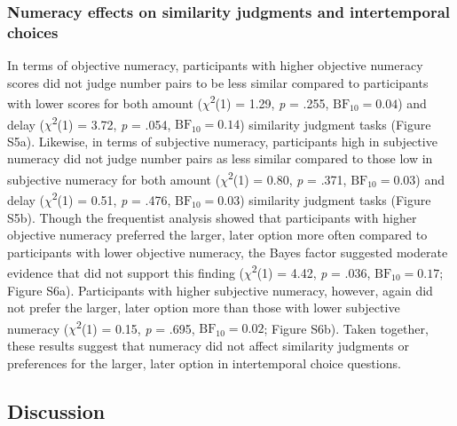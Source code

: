 \documentclass[
  pub,floatsintext]{apa6}
\begin{document}
\hypertarget{numeracy-effects-on-similarity-judgments-and-intertemporal-choices-1}{%
\subsubsection{Numeracy effects on similarity judgments and intertemporal choices}\label{numeracy-effects-on-similarity-judgments-and-intertemporal-choices-1}}

In terms of objective numeracy, participants with higher objective numeracy scores did not judge number pairs to be less similar compared to participants with lower scores for both amount (\(\chi\)\textsuperscript{2}(1) = 1.29, \emph{p} = .255, \(\mathrm{BF}_{\textrm{10}} = 0.04\)) and delay (\(\chi\)\textsuperscript{2}(1) = 3.72, \emph{p} = .054, \(\mathrm{BF}_{\textrm{10}} = 0.14\)) similarity judgment tasks (Figure S5a). Likewise, in terms of subjective numeracy, participants high in subjective numeracy did not judge number pairs as less similar compared to those low in subjective numeracy for both amount (\(\chi\)\textsuperscript{2}(1) = 0.80, \emph{p} = .371, \(\mathrm{BF}_{\textrm{10}} = 0.03\)) and delay (\(\chi\)\textsuperscript{2}(1) = 0.51, \emph{p} = .476, \(\mathrm{BF}_{\textrm{10}} = 0.03\)) similarity judgment tasks (Figure S5b). Though the frequentist analysis showed that participants with higher objective numeracy preferred the larger, later option more often compared to participants with lower objective numeracy, the Bayes factor suggested moderate evidence that did not support this finding (\(\chi\)\textsuperscript{2}(1) = 4.42, \emph{p} = .036, \(\mathrm{BF}_{\textrm{10}} = 0.17\); Figure S6a). Participants with higher subjective numeracy, however, again did not prefer the larger, later option more than those with lower subjective numeracy (\(\chi\)\textsuperscript{2}(1) = 0.15, \emph{p} = .695, \(\mathrm{BF}_{\textrm{10}} = 0.02\); Figure S6b). Taken together, these results suggest that numeracy did not affect similarity judgments or preferences for the larger, later option in intertemporal choice questions.

\hypertarget{discussion-1}{%
\subsection{Discussion}\label{discussion-1}}
\end{document}
